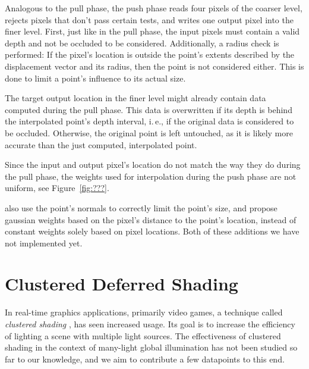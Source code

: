 Analogous to the pull phase, the push phase reads four pixels of the coarser level, rejects pixels that don't pass certain tests, and writes one output pixel into the finer level. First, just like in the pull phase, the input pixels must contain a valid depth and not be occluded to be considered. Additionally, a radius check is performed: If the pixel's location is outside the point's extents described by the displacement vector and its radius, then the point is not considered either. This is done to limit a point's influence to its actual size.

The target output location in the finer level might already contain data computed during the pull phase. This data is overwritten if its depth is behind the interpolated point's depth interval, i.\,e., if the original data is considered to be occluded. Otherwise, the original point is left untouched, as it is likely more accurate than the just computed, interpolated point.

Since the input and output pixel's location do not match the way they do during the pull phase, the weights used for interpolation during the push phase are not uniform, see Figure~\ref{fig:???}.

 \citet{Marroquim:2007:reconstruction} also use the point's normals to correctly limit the point's size, and \citet{Marroquim:2008:reconstruction2} propose gaussian weights based on the pixel's distance to the point's location, instead of constant weights solely based on pixel locations. Both of these additions we have not implemented yet.



\section{Clustered Deferred Shading}
\label{sec:concept:clusteredShading}

In real-time graphics applications, primarily video games, a technique called \textit{clustered shading} \citep{olsson2012clustered}, has seen increased usage. Its goal is to increase the efficiency of lighting a scene with multiple light sources.
The effectiveness of clustered shading in the context of many-light global illumination has not been studied so far to our knowledge, and we aim to contribute a few datapoints to this end.

